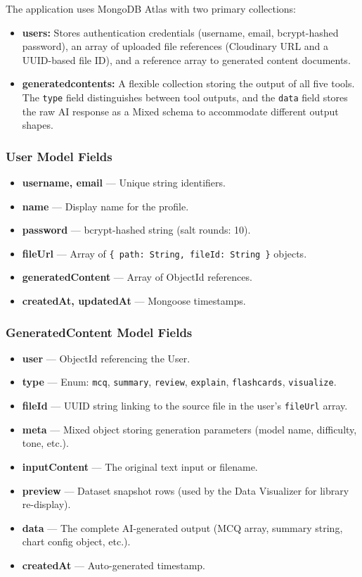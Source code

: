 \documentclass[12pt,a4paper]{article}
\begin{document}
The application uses MongoDB Atlas with two primary collections:

\begin{itemize}
  \item \textbf{users:} Stores authentication credentials (username, email, bcrypt-hashed password), an array of uploaded file references (Cloudinary URL and a UUID-based file ID), and a reference array to generated content documents.
  \item \textbf{generatedcontents:} A flexible collection storing the output of all five tools. The \texttt{type} field distinguishes between tool outputs, and the \texttt{data} field stores the raw AI response as a Mixed schema to accommodate different output shapes.
\end{itemize}

\subsubsection*{User Model Fields}
\begin{itemize}
  \item \textbf{username, email} --- Unique string identifiers.
  \item \textbf{name} --- Display name for the profile.
  \item \textbf{password} --- bcrypt-hashed string (salt rounds: 10).
  \item \textbf{fileUrl} --- Array of \texttt{\{ path: String, fileId: String \}} objects.
  \item \textbf{generatedContent} --- Array of ObjectId references.
  \item \textbf{createdAt, updatedAt} --- Mongoose timestamps.
\end{itemize}

\subsubsection*{GeneratedContent Model Fields}
\begin{itemize}
  \item \textbf{user} --- ObjectId referencing the User.
  \item \textbf{type} --- Enum: \texttt{mcq}, \texttt{summary}, \texttt{review}, \texttt{explain}, \texttt{flashcards}, \texttt{visualize}.
  \item \textbf{fileId} --- UUID string linking to the source file in the user's \texttt{fileUrl} array.
  \item \textbf{meta} --- Mixed object storing generation parameters (model name, difficulty, tone, etc.).
  \item \textbf{inputContent} --- The original text input or filename.
  \item \textbf{preview} --- Dataset snapshot rows (used by the Data Visualizer for library re-display).
  \item \textbf{data} --- The complete AI-generated output (MCQ array, summary string, chart config object, etc.).
  \item \textbf{createdAt} --- Auto-generated timestamp.
\end{itemize}
\end{document}

